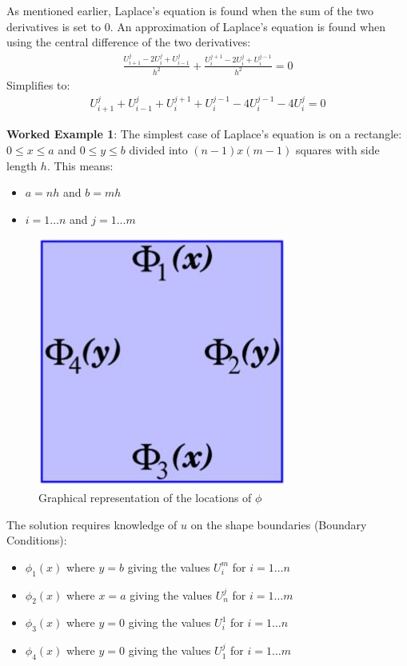 \documentclass[10pt,a4paper]{article}
\begin{document}
As mentioned earlier, Laplace's equation is found when the sum of the two derivatives is set to 0.
An approximation of Laplace's equation is found when using the central difference of the two
derivatives:
\begin{align*}
    \frac{U_{i+1}^j - 2U_i^j + U_{i-1}^j}{h^2} + \frac{U_i^{j+1}-2U_i^j + U_i^{j-1}}{h^2} = 0 
\end{align*}
Simplifies to:
\begin{align*}
    U_{i+1}^j + U_{i-1}^j + U_i^{j+1} + U_i^{j-1} - 4U_i^{j-1} - 4U_i^j = 0
\end{align*}

\textbf{Worked Example 1}: The simplest case of Laplace's equation is on a rectangle: $0\leq x\leq
a$ and $0\leq y \leq b$ divided into $(n-1)x(m-1)$ squares with side length $h$. This means: 
\begin{itemize}
    \item $a=nh$ and $b=mh$
    \item $i=1\dots n$ and $j=1\dots m$ 
\end{itemize}

\begin{figure} [h!]
    \centering
    \includegraphics[scale=0.4]{Square.JPG}
    \caption{Graphical representation of the locations of $\phi$}
\end{figure}

The solution requires knowledge of $u$ on the shape boundaries (Boundary Conditions):
\begin{itemize}
    \item $\phi_1(x)$ where $y=b$ giving the values $U_i^m$ for $i=1\dots n$
    \item $\phi_2(x)$ where $x=a$ giving the values $U_n^j$ for $i=1\dots m$
    \item $\phi_3(x)$ where $y=0$ giving the values $U_i^1$ for $i=1\dots n$
    \item $\phi_4(x)$ where $y=0$ giving the values $U_1^j$ for $i=1\dots m$
\end{itemize}
\end{document}
